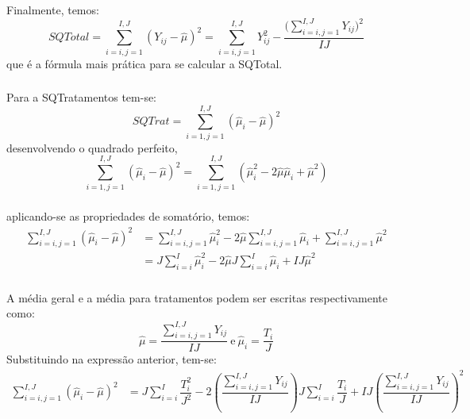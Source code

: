 \documentclass[14pt,aspectratio=1610]{beamer}
\begin{document}
\begin{frame}{}
\frametitle{}
\begin{block}{}
\justifying
Finalmente, temos:
$$
SQTotal={\displaystyle \sum_{i=i,j=1}^{I,J}(Y_{ij}-\hat{\mu})^{2}}=
{\displaystyle \sum_{i=i,j=1}^{I,J}Y_{ij}^{2}-\dfrac{\Biggl({\displaystyle \sum_{i=i,j=1}^{I,J}Y_{ij}}\Biggl)^{2}}{IJ}}
$$
que é a fórmula mais prática para se calcular a SQTotal.
\end{block}
\end{frame}

\begin{frame}{}
\frametitle{}
\begin{block}{}
\justifying
Para a SQTratamentos tem-se:
$$SQTrat={\displaystyle \sum_{i=1,j=1}^{I,J}(\hat{\mu}_{i}-\hat{\mu})^{2}}$$\pause
desenvolvendo o quadrado perfeito,
$${\displaystyle \sum_{i=1,j=1}^{I,J}(\hat{\mu}_{i}-\hat{\mu})^{2}}=
{\displaystyle \sum_{i=1,j=1}^{I,J}(\hat{\mu}_{i}^{2}-2\hat{\mu}\hat{\mu}_{i}+\hat{\mu}^{2})}$$
\end{block}
\end{frame}

\begin{frame}{}
\frametitle{}
\begin{block}{}
\justifying
aplicando-se as propriedades de somatório, temos:
\begin{align}
{\displaystyle \sum_{i=i,j=1}^{I,J}(\hat{\mu}_{i}-\hat{\mu})^{2}}&=
{\displaystyle \sum_{i=i,j=1}^{I,J}\hat{\mu}_{i}^{2}-2\hat{\mu}\sum_{i=i,j=1}^{I,J}\hat{\mu}_{i}+\sum_{i=i,j=1}^{I,J}\hat{\mu}^{2}}\\
&={\displaystyle J\sum_{i=i}^{I}\hat{\mu}_{i}^{2}-2\hat{\mu}J\sum_{i=i}^{I}\hat{\mu}_{i}+IJ\hat{\mu}^{2}}
\end{align}
\end{block}
\end{frame}

\begin{frame}{}
\frametitle{}
\begin{block}{}
\justifying
A média geral e a média para tratamentos podem ser escritas respectivamente como:
$$\hat{\mu}=\dfrac{{\displaystyle \sum_{i=i,j=1}^{I,J}Y_{ij}}}{IJ}\ \textrm{e}\ 
\hat{\mu}_{i}=\dfrac{T_{i}}{J}$$
Substituindo na expressão anterior, tem-se:
\begin{align*}
{\displaystyle \sum_{i=i,j=1}^{I,J}(\hat{\mu}_{i}-\hat{\mu})^{2}}&={\displaystyle J\sum_{i=i}^{I}\dfrac{T_{i}^{2}}{J^{2}}-2\left(\dfrac{{\displaystyle \sum_{i=i,j=1}^{I,J}Y_{ij}}}{IJ}\right)J\sum_{i=i}^{I}\dfrac{T_{i}}{J}+IJ\left(\dfrac{{\displaystyle \sum_{i=i,j=1}^{I,J}Y_{ij}}}{IJ}\right)^{2}}
\end{align*}
\end{block}
\end{frame}
\end{document}
